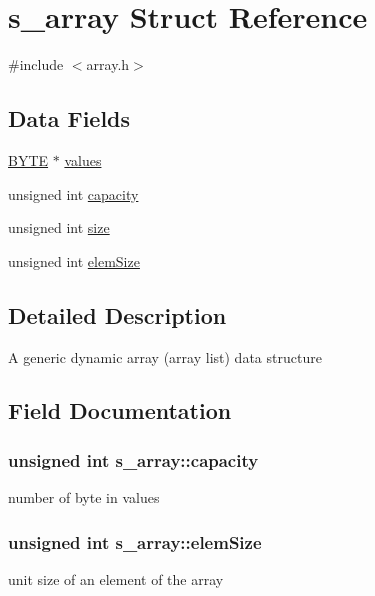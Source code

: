 \hypertarget{structs__array}{}\section{s\+\_\+array Struct Reference}
\label{structs__array}


{\ttfamily \#include $<$array.\+h$>$}

\subsection*{Data Fields}
\begin{DoxyCompactItemize}
\item 
\hyperlink{array_8h_aec93e83855ac17c3c25c55c37ca186dd}{B\+Y\+TE} $\ast$ \hyperlink{structs__array_ab4b5430249c910887c7c9012b267449d}{values}
\item 
unsigned int \hyperlink{structs__array_a4b10432f7665a73193eb679f7e5bb982}{capacity}
\item 
unsigned int \hyperlink{structs__array_a819453b38ad73825737ef6fe300fd309}{size}
\item 
unsigned int \hyperlink{structs__array_abc755757def22e1211b202efd8777bba}{elem\+Size}
\end{DoxyCompactItemize}


\subsection{Detailed Description}
A generic dynamic array (\textquotesingle{}array list\textquotesingle{}) data structure 

\subsection{Field Documentation}
\subsubsection[{\texorpdfstring{capacity}{capacity}}]{\setlength{\rightskip}{0pt plus 5cm}unsigned int s\+\_\+array\+::capacity}\hypertarget{structs__array_a4b10432f7665a73193eb679f7e5bb982}{}\label{structs__array_a4b10432f7665a73193eb679f7e5bb982}
number of byte in \textquotesingle{}values\textquotesingle{} 
\subsubsection[{\texorpdfstring{elem\+Size}{elemSize}}]{\setlength{\rightskip}{0pt plus 5cm}unsigned int s\+\_\+array\+::elem\+Size}\hypertarget{structs__array_abc755757def22e1211b202efd8777bba}{}\label{structs__array_abc755757def22e1211b202efd8777bba}
unit size of an element of the array 
